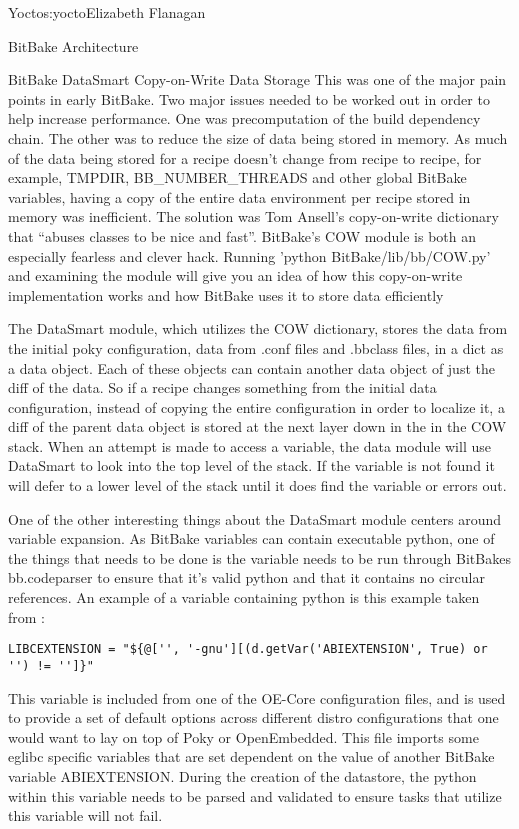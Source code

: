 \begin{aosachapter}{Yocto}{s:yocto}{Elizabeth Flanagan}
\begin{aosasect1}{BitBake Architecture}
\begin{aosasect2}{BitBake DataSmart Copy-on-Write Data Storage}
This was one of the major pain points in early BitBake. Two major
issues needed to be worked out in order to help increase performance.
One was precomputation of the build dependency chain. The other was to
reduce the size of data being stored in memory. As much of the data
being stored for a recipe doesn't change from recipe to recipe, for
example, TMPDIR, BB\_NUMBER\_THREADS and other global BitBake
variables, having a copy of the entire data environment per recipe
stored in memory was inefficient. The solution was Tom Ansell's
copy-on-write dictionary that ``abuses classes to be nice and fast''.
BitBake's COW module is both an especially fearless and clever hack.
Running 'python BitBake/lib/bb/COW.py' and examining the module will
give you an idea of how this copy-on-write implementation works and
how BitBake uses it to store data efficiently

The DataSmart module, which utilizes the COW dictionary, stores the
data from the initial poky configuration, data from .conf files and
.bbclass files, in a dict as a data object. Each of these objects can
contain another data object of just the diff of the data. So if a
recipe changes something from the initial data configuration, instead
of copying the entire configuration in order to localize it, a diff of
the parent data object is stored at the next layer down in the in the
COW stack. When an attempt is made to access a variable, the data
module will use DataSmart to look into the top level of the stack. If
the variable is not found it will defer to a lower level of the stack
until it does find the variable or errors out.

One of the other interesting things about the DataSmart module centers
around variable expansion. As BitBake variables can contain executable
python, one of the things that needs to be done is the variable needs
to be run through BitBakes bb.codeparser to ensure that it's valid
python and that it contains no circular references.  An example of a
variable containing python is this example taken from
:

\begin{verbatim}
LIBCEXTENSION = "${@['', '-gnu'][(d.getVar('ABIEXTENSION', True) or '') != '']}"
\end{verbatim}

This variable is included from one of the OE-Core configuration files,
\linebreak {} and is used to
provide a set of default options across different distro
configurations that one would want to lay on top of Poky or
OpenEmbedded. This file imports some eglibc specific variables that
are set dependent on the value of another BitBake variable
ABIEXTENSION. During the creation of the datastore, the python within
this variable needs to be parsed and validated to ensure tasks that
utilize this variable will not fail.


\end{aosasect2}
\end{aosasect1}
\end{aosachapter}
